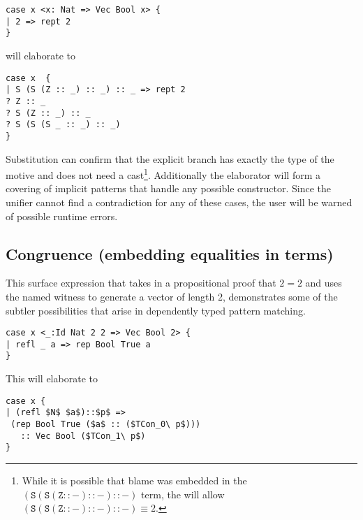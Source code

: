 \begin{lstlisting}[basicstyle={\ttfamily\small}]
case x <x: Nat => Vec Bool x> {
| 2 => rept 2
}
\end{lstlisting}
 
will elaborate to
\begin{lstlisting}[basicstyle={\ttfamily\small}]
case x  {
| S (S (Z :: _) :: _) :: _ => rept 2
? Z :: _
? S (Z :: _) :: _
? S (S (S _ :: _) :: _)
}
\end{lstlisting}
 
Substitution can confirm that the explicit branch has exactly the type of the motive and does not need a cast\footnote{
  While it is possible that blame was embedded in the $\mathtt{(S (S (Z :: -) :: -) :: -)}$ term, the \csys{} will allow $\mathtt{(S (S (Z :: -) :: -) :: -)}\equiv2$.
}.
Additionally the elaborator will form a covering of implicit patterns that handle any possible constructor.
Since the unifier cannot find a contradiction for any of these cases, the user will be warned of possible runtime errors.
 
\subsection{Congruence (embedding equalities in terms)}
This surface expression that takes in a propositional proof that $2=2$ and uses the named witness to generate a vector of length 2, demonstrates some of the subtler possibilities that arise in dependently typed pattern matching.

\begin{lstlisting}[basicstyle={\ttfamily\small}]
case x <_:Id Nat 2 2 => Vec Bool 2> {
| refl _ a => rep Bool True a
}
\end{lstlisting}
 
This will elaborate to
 
\begin{lstlisting}[basicstyle={\ttfamily\small}]
case x {
| (refl $N$ $a$)::$p$ =>
 (rep Bool True ($a$ :: ($TCon_0\ p$)))
   :: Vec Bool ($TCon_1\ p$)
}
\end{lstlisting}

